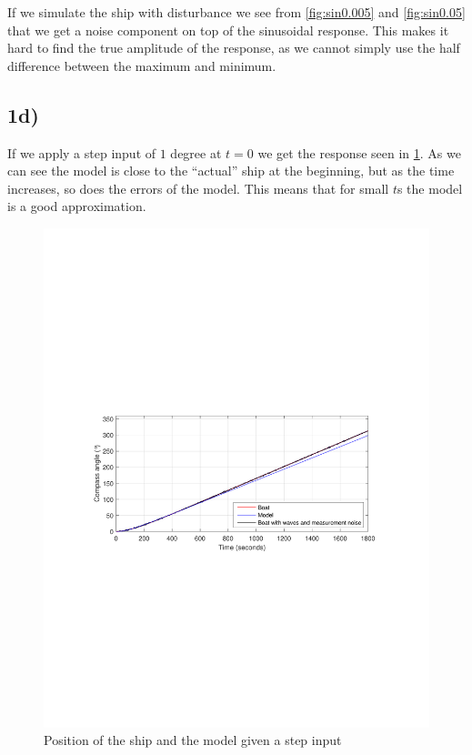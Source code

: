 If we simulate the ship with disturbance we see from \cref{fig:sin0.005}  and \cref{fig:sin0.05} that we get a noise component on top of the sinusoidal response. This makes it hard to find the true amplitude of the response, as we cannot simply use the half difference between the maximum and minimum.

\subsection{1d)}

If we apply a step input of $1$ degree at $t=0$ we get the response seen in \cref{fig:step_1}. As we can see the model is close to the ``actual'' ship at the beginning, but as the time increases, so does the errors of the model. This means that for small $t$s the model is a good approximation.

\begin{figure}
	\centering
	\includegraphics[width=\textwidth]{images/oppg1/step1_with_model_trafu.pdf}
	\caption{Position of the ship and the model given a step input}
	\label{fig:step_1}
\end{figure}
